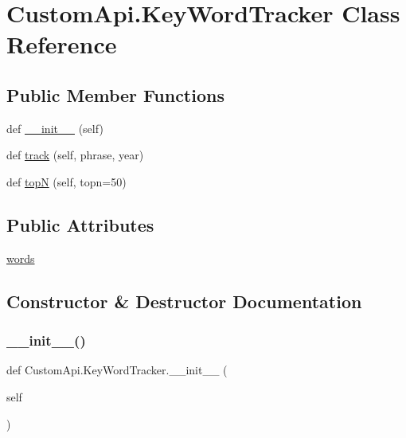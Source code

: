 \hypertarget{class_custom_api_1_1_key_word_tracker}{}\section{Custom\+Api.\+Key\+Word\+Tracker Class Reference}
\label{class_custom_api_1_1_key_word_tracker}
\subsection*{Public Member Functions}
\begin{DoxyCompactItemize}
\item 
def \mbox{\hyperlink{class_custom_api_1_1_key_word_tracker_af9c736d329edd015611814ff058f60fa}{\+\_\+\+\_\+init\+\_\+\+\_\+}} (self)
\item 
def \mbox{\hyperlink{class_custom_api_1_1_key_word_tracker_a4f2161aaa62aa8fab3a59639c66e9ed6}{track}} (self, phrase, year)
\item 
def \mbox{\hyperlink{class_custom_api_1_1_key_word_tracker_a5a209831b338e13cef4bd9e909efdc9b}{topN}} (self, topn=50)
\end{DoxyCompactItemize}
\subsection*{Public Attributes}
\begin{DoxyCompactItemize}
\item 
\mbox{\hyperlink{class_custom_api_1_1_key_word_tracker_ab8ddc706d00cd4ffe621bad6baf698e0}{words}}
\end{DoxyCompactItemize}


\subsection{Constructor \& Destructor Documentation}
\mbox{\label{class_custom_api_1_1_key_word_tracker_af9c736d329edd015611814ff058f60fa}} 
\subsubsection{\texorpdfstring{\+\_\+\+\_\+init\+\_\+\+\_\+()}{\_\_init\_\_()}}
{\footnotesize\ttfamily def Custom\+Api.\+Key\+Word\+Tracker.\+\_\+\+\_\+init\+\_\+\+\_\+ (\begin{DoxyParamCaption}\item[{}]{self }\end{DoxyParamCaption})}



